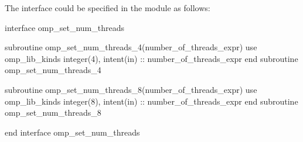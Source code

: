 The  interface could be specified in the  module 
as follows:

\begin{boxedcode}
interface omp\_set\_num\_threads

    subroutine omp\_set\_num\_threads_4(number\_of\_threads\_expr)
      use omp\_lib\_kinds
      integer(4), intent(in) :: number\_of\_threads\_expr
    end subroutine omp\_set\_num\_threads_4

    subroutine omp\_set\_num\_threads_8(number\_of\_threads\_expr)
      use omp\_lib\_kinds
      integer(8), intent(in) :: number\_of\_threads\_expr
    end subroutine omp\_set\_num\_threads_8

end interface omp\_set\_num\_threads
\end{boxedcode}



